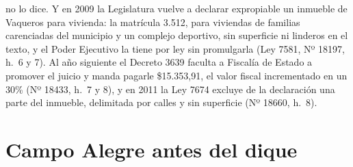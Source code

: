 no lo dice. Y en 2009 la Legislatura vuelve a declarar expropiable un inmueble de Vaqueros para vivienda: la matrícula 3.512, para viviendas de familias carenciadas del municipio y un complejo deportivo, sin superficie ni linderos en el texto, y el Poder Ejecutivo la tiene por ley sin promulgarla (Ley 7581, Nº 18197, h.\ 6 y 7). Al año siguiente el Decreto 3639 faculta a Fiscalía de Estado a promover el juicio y manda pagarle \$15.353,91, el valor fiscal incrementado en un 30\% (Nº 18433, h.\ 7 y 8), y en 2011 la Ley 7674 excluye de la declaración una parte del inmueble, delimitada por calles y sin superficie (Nº 18660, h.\ 8).

\section{Campo Alegre antes del dique}

